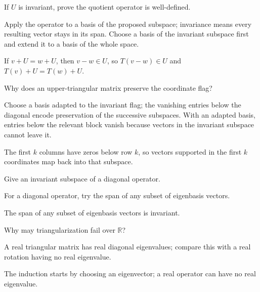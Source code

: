 \begin{exercise}\label{exr:i10-02}
If $U$ is invariant, prove the quotient operator is well-defined.
\end{exercise}
\begin{hint}
Apply the operator to a basis of the proposed subspace; invariance means every resulting vector stays in its span. Choose a basis of the invariant subspace first and extend it to a basis of the whole space.
\end{hint}
\begin{solution}
If $v+U=w+U$, then $v-w\in U$, so $T(v-w)\in U$ and $T(v)+U=T(w)+U$.
\end{solution}

\begin{exercise}\label{exr:i10-03}
Why does an upper-triangular matrix preserve the coordinate flag?
\end{exercise}
\begin{hint}
Choose a basis adapted to the invariant flag; the vanishing entries below the diagonal encode preservation of the successive subspaces. With an adapted basis, entries below the relevant block vanish because vectors in the invariant subspace cannot leave it.
\end{hint}
\begin{solution}
The first $k$ columns have zeros below row $k$, so vectors supported in the first $k$ coordinates map back into that subspace.
\end{solution}

\begin{exercise}\label{exr:i10-04}
Give an invariant subspace of a diagonal operator.
\end{exercise}
\begin{hint}
For a diagonal operator, try the span of any subset of eigenbasis vectors.
\end{hint}
\begin{solution}
The span of any subset of eigenbasis vectors is invariant.
\end{solution}

\begin{exercise}\label{exr:i10-05}
Why may triangularization fail over $\mathbb R$?
\end{exercise}
\begin{hint}
A real triangular matrix has real diagonal eigenvalues; compare this with a real rotation having no real eigenvalue.
\end{hint}
\begin{solution}
The induction starts by choosing an eigenvector; a real operator can have no real eigenvalue.
\end{solution}

